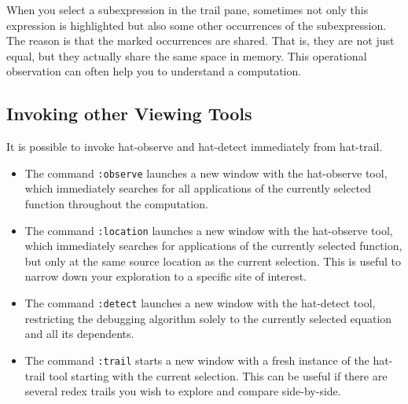 \documentclass[12pt]{article}
\newenvironment{code}{\begin{quote}\begin{alltt}}{\end{alltt}\end{quote}}
\newcommand{\com}[1]{\texttt{#1}}
\begin{document}
When you select a subexpression in the trail pane, sometimes not
only this expression is highlighted but also some other occurrences
of the subexpression.  The reason is that the marked occurrences are
shared. That is, they are not just equal, but they actually share
the same space in memory.  This operational observation can often
help you to understand a computation.






\subsection{Invoking other Viewing Tools}

It is possible to invoke hat-observe and hat-detect immediately
from hat-trail.

\begin{itemize}
\item The command \com{:observe} launches a new window with the
hat-observe tool, which immediately searches for all applications of
the currently selected function throughout the computation.
\item The command \com{:location} launches a new window with the
hat-observe tool, which immediately searches for applications of the
currently selected function, but only at the same source location as
the current selection.  This is useful to narrow down your exploration
to a specific site of interest.
\item The command \com{:detect} launches a new window with the
hat-detect tool, restricting the debugging algorithm solely to the
currently selected equation and all its dependents.
\item The command \com{:trail} starts a new window with a fresh
instance of the hat-trail tool starting with the current selection.
This can be useful if there are several redex trails you wish to
explore and compare side-by-side.
\end{itemize}
\end{document}
